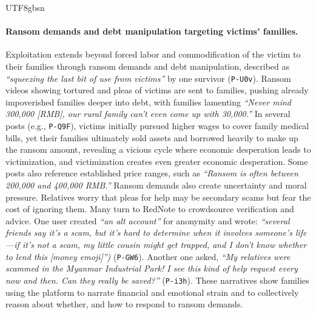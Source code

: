 \documentclass[sigconf,nonacm]{acmart}
\newcommand{\rev}[1]{#1}
\newcommand{\add}[1]{#1}
\begin{document}
\begin{CJK}{UTF8}{gbsn}
\paragraph{\textbf{Ransom demands and debt manipulation targeting victims' families.}} \rev{Exploitation extends beyond forced labor and commodification of the victim to their families through ransom demands and debt manipulation, described as \textit{``squeezing the last bit of use from victims''} by one survivor (\texttt{P-U0v}). Ransom videos showing tortured and pleas of victims are sent to families, pushing already impoverished families deeper into debt, with families lamenting \textit{``Never mind 300,000 [RMB], our rural family can't even come up with 30,000.''} In several posts (e.g., \texttt{P-Q9F}), victims initially pursued higher wages to cover family medical bills, yet their families ultimately sold assets and borrowed heavily to make up the ransom amount, revealing a vicious cycle where economic desperation leads to victimization, and victimization creates even greater economic desperation. Some posts also reference established price ranges, such as \textit{``Ransom is often between 200,000 and 400,000 RMB.''}} \add{Ransom demands also create uncertainty and moral pressure. Relatives worry that pleas for help may be secondary scams but fear the cost of ignoring them. Many turn to RedNote to crowdsource verification and advice. One user created \textit{``an alt account''} for anonymity and wrote: \textit{``several friends say it's a scam, but it's hard to determine when it involves someone's life---if it's not a scam, my little cousin might get trapped, and I don't know whether to lend this [money emoji]'')} (\texttt{P-GW6}). Another one asked, \textit{``My relatives were scammed in the Myanmar Industrial Park! I see this kind of help request every now and then. Can they really be saved?''} (\texttt{P-i3h}). These narratives show families using the platform to narrate financial and emotional strain and to collectively reason about whether, and how to respond to ransom demands.}


\end{CJK}
\end{document}

